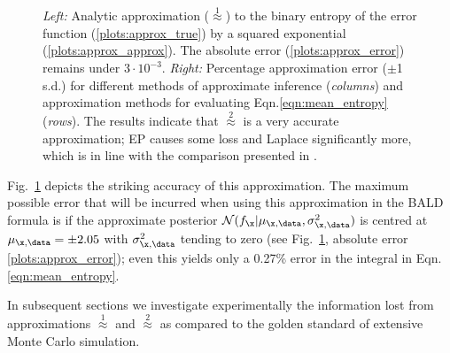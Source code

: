 \begin{figure}
	\centering

	\caption[Taylor series approximation to the value of information in GP classification]{\emph{Left:} Analytic approximation ({\scriptsize $\stackrel{1}{\approx}$}) to the binary entropy of the error function (\ref{plots:approx_true}) by a squared exponential (\ref{plots:approx_approx}). The absolute error (\ref{plots:approx_error}) remains under $3\cdot 10^{-3}$. \emph{Right:} Percentage approximation error ($\pm$1 s.d.) for different methods of approximate inference (\emph{columns}) and approximation methods for evaluating Eqn.\eqref{eqn:mean_entropy} (\emph{rows}). The results indicate that {\scriptsize $\stackrel{2}{\approx}$} is a very accurate approximation; EP causes some loss and Laplace significantly more, which is in line with the comparison presented in \citep{Kuss2005}. }\label{fig:trick}
\end{figure}

Fig.\ \ref{fig:trick} depicts the striking accuracy of this approximation. The maximum possible error that will be incurred when using this approximation in the BALD formula is if the approximate posterior $\mathcal{N}(f_{\x}\vert \mu_{\x,\data},\sigma_{\x,\data}^2)$ is centred at $\mu_{\x,\data}=\pm 2.05$  with $\sigma_{\x,\data}^2$ tending to zero (see Fig.\ \ref{fig:trick}, absolute error \ref{plots:approx_error}); even this yields only a 0.27\% error in the integral in Eqn.\eqref{eqn:mean_entropy}.

In subsequent sections we investigate experimentally the information lost from approximations {\scriptsize $\stackrel{1}{\approx}$} and {\scriptsize $\stackrel{2}{\approx}$} as compared to the golden standard of extensive Monte Carlo simulation.

